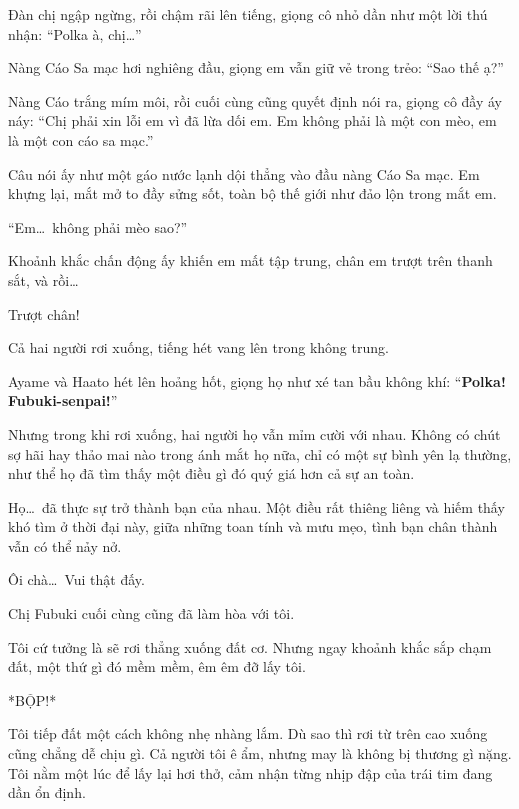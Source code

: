 \documentclass[../main.tex]{subfiles}
\begin{document}

Đàn chị ngập ngừng, rồi chậm rãi lên tiếng, giọng cô nhỏ dần như một lời thú nhận: ``Polka à, chị\dots''

Nàng Cáo Sa mạc hơi nghiêng đầu, giọng em vẫn giữ vẻ trong trẻo: ``Sao thế ạ?''

Nàng Cáo trắng mím môi, rồi cuối cùng cũng quyết định nói ra, giọng cô đầy áy náy: ``Chị phải xin lỗi em vì đã lừa dối em. Em không phải là một con mèo, em là một con cáo sa mạc.''

Câu nói ấy như một gáo nước lạnh dội thẳng vào đầu nàng Cáo Sa mạc. Em khựng lại, mắt mở to đầy sửng sốt, toàn bộ thế giới như đảo lộn trong mắt em.

``Em\dots\ không phải mèo sao?''

Khoảnh khắc chấn động ấy khiến em mất tập trung, chân em trượt trên thanh sắt, và rồi\dots

Trượt chân!

Cả hai người rơi xuống, tiếng hét vang lên trong không trung.

Ayame và Haato hét lên hoảng hốt, giọng họ như xé tan bầu không khí: ``\textbf{Polka! Fubuki-senpai!}''

Nhưng trong khi rơi xuống, hai người họ vẫn mỉm cười với nhau. Không có chút sợ hãi hay thảo mai nào trong ánh mắt họ nữa, chỉ có một sự bình yên lạ thường, như thể họ đã tìm thấy một điều gì đó quý giá hơn cả sự an toàn.

Họ\dots\ đã thực sự trở thành bạn của nhau. Một điều rất thiêng liêng và hiếm thấy khó tìm ở thời đại này, giữa những toan tính và mưu mẹo, tình bạn chân thành vẫn có thể nảy nở.

\omk


Ôi chà\dots\ Vui thật đấy.

Chị Fubuki cuối cùng cũng đã làm hòa với tôi.

Tôi cứ tưởng là sẽ rơi thẳng xuống đất cơ. Nhưng ngay khoảnh khắc sắp chạm đất, một thứ gì đó mềm mềm, êm êm đỡ lấy tôi.


*BỘP!*

Tôi tiếp đất một cách không nhẹ nhàng lắm. Dù sao thì rơi từ trên cao xuống cũng chẳng dễ chịu gì. Cả người tôi ê ẩm, nhưng may là không bị thương gì nặng. Tôi nằm một lúc để lấy lại hơi thở, cảm nhận từng nhịp đập của trái tim đang dần ổn định.
\end{document}
